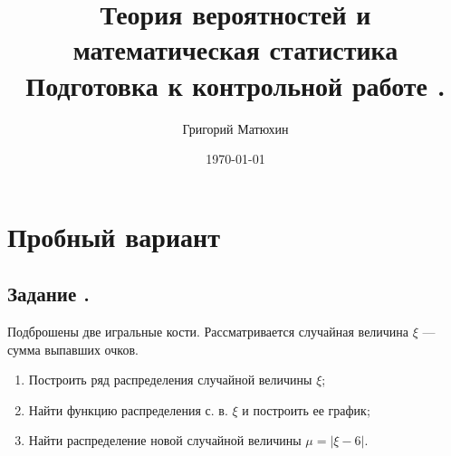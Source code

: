 \documentclass[12pt]{article}
\author{Григорий Матюхин}
\date{\today}
\title{
	Теория вероятностей и математическая статистика \\
	\large Подготовка к контрольной работе \textnumero2.
}
\begin{document}
\maketitle
\newpage
\tableofcontents
\newpage

\section{Пробный вариант}
\subsection{Задание .}
Подброшены две игральные кости. Рассматривается случайная величина $\xi$ --- сумма выпавших очков.
\begin{enumerate}
	\item Построить ряд распределения случайной величины $\xi$;
	\item Найти функцию распределения с. в. $\xi$ и построить ее график;
	\item Найти распределение новой случайной величины $\mu = |\xi - 6|$.
\end{enumerate}
\end{document}
